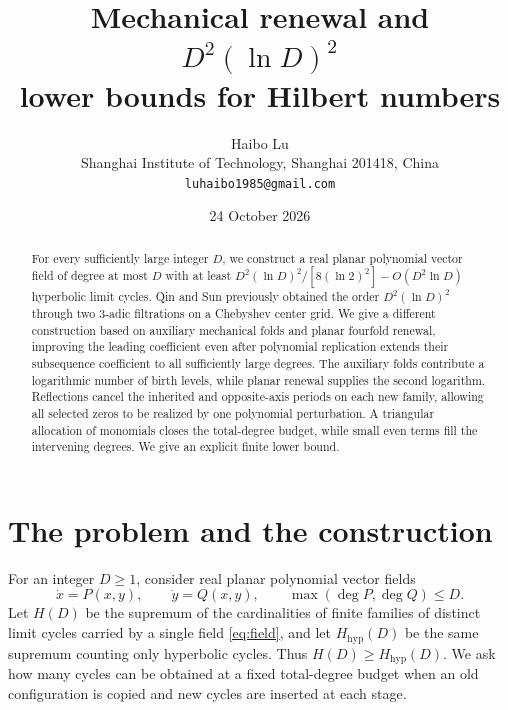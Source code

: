 \documentclass[11pt]{article}
\title{Mechanical renewal and $D^2(\ln D)^2$\\ lower bounds for Hilbert numbers}
\author{Haibo Lu\\\small Shanghai Institute of Technology, Shanghai 201418, China\\
  \small\texttt{luhaibo1985@gmail.com}}
\date{24 October 2026}
\numberwithin{equation}{section}
\theoremstyle{definition}
\theoremstyle{remark}
\newcommand{\Hhyp}{H_{\mathrm{hyp}}}
\begin{document}
\maketitle
\begin{abstract}
For every sufficiently large integer $D$, we construct a real planar
polynomial vector field of degree at most $D$ with at least
$D^2(\ln D)^2/[8(\ln 2)^2]-O(D^2\ln D)$ hyperbolic limit cycles.
Qin and Sun previously obtained the order $D^2(\ln D)^2$ through two
3-adic filtrations on a Chebyshev center grid. We give a different construction based on
auxiliary mechanical folds and planar fourfold renewal, improving the leading
coefficient even after polynomial replication extends their subsequence
coefficient to all sufficiently large degrees.
The auxiliary folds contribute a logarithmic number of birth levels, while
planar renewal supplies the second logarithm. Reflections cancel the inherited and opposite-axis periods on
each new family, allowing all selected zeros to be realized by one polynomial
perturbation. A triangular allocation of monomials closes the total-degree
budget, while small even terms fill the intervening degrees. We give an
explicit finite lower bound.
\end{abstract}

\section{The problem and the construction}

For an integer $D\ge1$, consider real planar polynomial vector fields
\begin{equation}\label{eq:field}
 \dot x=P(x,y),\qquad \dot y=Q(x,y),\qquad
 \max(\deg P,\deg Q)\le D.
\end{equation}
Let $H(D)$ be the supremum of the cardinalities of finite families of
distinct limit cycles carried by a single field \eqref{eq:field}, and
let $\Hhyp(D)$ be the same supremum counting only hyperbolic cycles.
Thus $H(D)\ge\Hhyp(D)$. We ask how many cycles can be obtained at a fixed total-degree
budget when an old configuration is copied and new cycles are inserted
at each stage.
\end{document}
